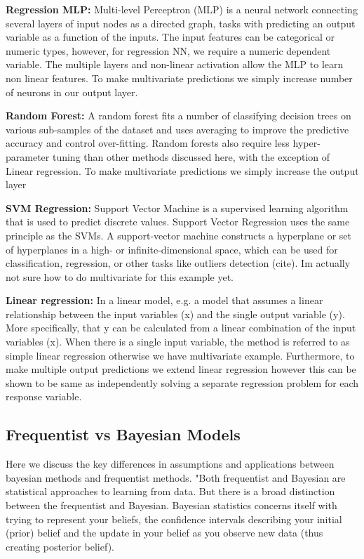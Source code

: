 \documentclass[journal,twoside,web]{ieeecolor}
\begin{document}
\textbf{Regression MLP: } Multi-level Perceptron (MLP) is a neural network connecting several layers of input nodes as a directed graph, tasks with predicting an output variable as a function of the inputs. The input features can be categorical or numeric types, however, for regression NN, we require a numeric dependent variable. The multiple layers and non-linear activation allow the MLP to learn non linear features. To make multivariate predictions we simply increase number of neurons in our output layer. 


\textbf{Random Forest: } A random forest fits a number of classifying decision trees on various sub-samples of the dataset and uses averaging to improve the predictive accuracy and control over-fitting. Random forests also require less hyper-parameter tuning than other methods discussed here, with the exception of Linear regression.  To make multivariate predictions we simply increase the output layer

\textbf{SVM Regression: } Support Vector Machine is a supervised learning algorithm that is used to predict discrete values. Support Vector Regression uses the same principle as the SVMs. A support-vector machine constructs a hyperplane or set of hyperplanes in a high- or infinite-dimensional space, which can be used for classification, regression, or other tasks like outliers detection (cite). Im actually not sure how to do multivariate for this example yet. 

\textbf{Linear regression: } In a linear model, e.g. a model that assumes a linear relationship between the input variables (x) and the single output variable (y). More specifically, that y can be calculated from a linear combination of the input variables (x). When there is a single input variable, the method is referred to as simple linear regression otherwise we have multivariate example. Furthermore, to make multiple output predictions we extend linear regression however this can be shown to be same as independently solving a separate regression problem for each response variable.



\subsection{Frequentist vs Bayesian Models}
Here we discuss the key differences in assumptions and applications between bayesian methods and frequentist methods. 
"Both frequentist and Bayesian are statistical approaches to learning from data. But there is a broad distinction between the frequentist and Bayesian. 
Bayesian statistics concerns itself with trying to represent your beliefs, the confidence intervals describing your initial (prior) belief and the update in your belief as you observe new data (thus creating posterior belief).
\end{document}

